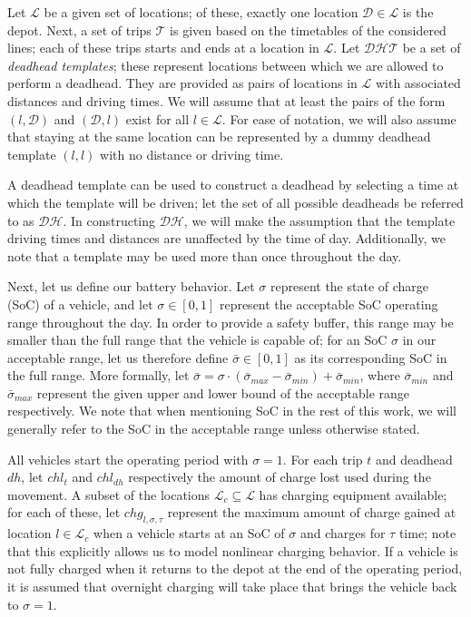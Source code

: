 \documentclass[]{article}
\begin{document}
Let $\mathcal{L}$ be a given set of locations; of these, exactly one location $\mathcal{D} \in \mathcal{L}$ is the depot. Next, a set of trips $\mathcal{T}$ is given based on the timetables of the considered lines; each of these trips starts and ends at a location in $\mathcal{L}$. Let $\mathcal{DHT}$ be a set of \emph{deadhead templates}; these represent locations between which we are allowed to perform a deadhead. They are provided as pairs of locations in $\mathcal{L}$ with associated distances and driving times. We will assume that at least the pairs of the form $(l, \mathcal{D})$ and $(\mathcal{D}, l)$ exist for all $l \in \mathcal{L}$. For ease of notation, we will also assume that staying at the same location can be represented by a dummy deadhead template $(l, l)$ with no distance or driving time. 

A deadhead template can be used to construct a deadhead by selecting a time at which the template will be driven; let the set of all possible deadheads be referred to as $\mathcal{DH}$. In constructing $\mathcal{DH}$, we will make the assumption that the template driving times and distances are unaffected by the time of day. Additionally, we note that a template may be used more than once throughout the day. 

Next, let us define our battery behavior. Let $\sigma$ represent the state of charge (SoC) of a vehicle, and let $\sigma \in [0, 1]$ represent the acceptable SoC operating range throughout the day. In order to provide a safety buffer, this range may be smaller than the full range that the vehicle is capable of; for an SoC $\sigma$ in our acceptable range, let us therefore define $\bar{\sigma} \in [0, 1]$ as its corresponding SoC in the full range. More formally, let $\bar{\sigma} = \sigma \cdot (\bar{\sigma}_{max} - \bar{\sigma}_{min}) + \bar{\sigma}_{min}$, where $\bar{\sigma}_{min}$ and $\bar{\sigma}_{max}$ represent the given upper and lower bound of the acceptable range respectively. We note that when mentioning SoC in the rest of this work, we will generally refer to the SoC in the acceptable range unless otherwise stated.  

All vehicles start the operating period with $\sigma=1$. For each trip $t$ and deadhead $dh$, let $chl_t$ and $chl_{dh}$ respectively the amount of charge lost used during the movement. A subset of the locations $\mathcal{L}_c \subseteq \mathcal{L}$ has charging equipment available; for each of these, let $chg_{l,\sigma,\tau}$ represent the maximum amount of charge gained at location $l \in \mathcal{L}_c$ when a vehicle starts at an SoC of $\sigma$ and charges for $\tau$ time; note that this explicitly allows us to model nonlinear charging behavior. If a vehicle is not fully charged when it returns to the depot at the end of the operating period, it is assumed that overnight charging will take place that brings the vehicle back to $\sigma=1$. 
\end{document}
